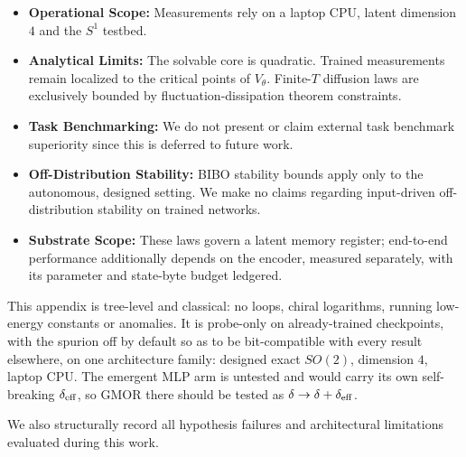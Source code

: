 \documentclass{article}
\begin{document}
\begin{itemize}
    \item \textbf{Operational Scope:} Measurements rely on a laptop CPU, latent dimension $4$ and the $S^1$ testbed.
    \item \textbf{Analytical Limits:} The solvable core is quadratic. Trained measurements remain localized to the critical points of $V_\theta$. Finite-$T$ diffusion laws are exclusively bounded by fluctuation-dissipation theorem constraints.
    \item \textbf{Task Benchmarking:} We do not present or claim external task benchmark superiority since this is deferred to future work.
    \item \textbf{Off-Distribution Stability:} BIBO stability bounds apply only to the autonomous, designed setting. We make no claims regarding input-driven off-distribution stability on trained networks.
    \item \textbf{Substrate Scope:} These laws govern a latent memory register; end-to-end performance additionally depends on the encoder, measured separately, with its parameter and state-byte budget ledgered.
\end{itemize}

This appendix is tree-level and classical: no loops, chiral logarithms, running low-energy constants or anomalies. It is probe-only on already-trained checkpoints, with the spurion off by default so as to be bit-compatible with every result elsewhere, on one architecture family: designed exact $SO(2)$, dimension $4$, laptop CPU. The emergent MLP arm is untested and would carry its own self-breaking $\delta_{\rm eff}$, so GMOR there should be tested as $\delta\to\delta+\delta_{\rm eff}$.

We also structurally record all hypothesis failures and architectural limitations evaluated during this work.
\end{document}
